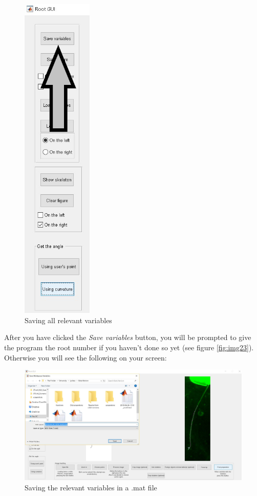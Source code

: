 \begin{figure}[H]
	\centering
	\includegraphics[width=0.3\textwidth]{../Figures/manual/save1.jpg}
	\caption{Saving all relevant variables}
	\label{fig:img24} 
\end{figure}

After you have clicked the \textit{Save variables} button, you will be prompted to give the program the root number if you haven't done so yet (see figure \ref{fig:img23}).
Otherwise you will see the following on your screen:

\begin{figure}[H]
	\centering
	\includegraphics[width=\textwidth]{../Figures/manual/save2.jpg}
	\caption{Saving the relevant variables in a .mat file}
	\label{fig:img25}
\end{figure}

